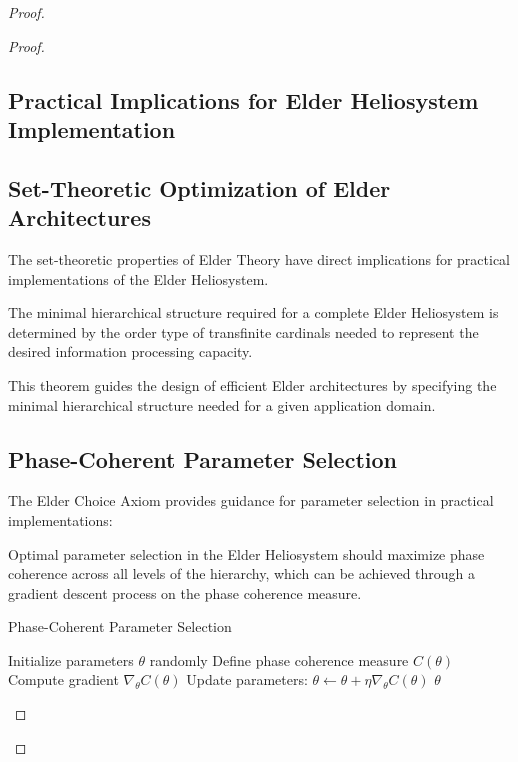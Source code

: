 \begin{theorem}
\begin{definition}
\begin{definition}
\begin{enumerate}
\begin{definition}
\begin{proof}
\begin{definition}
\begin{proof}
\begin{definition}
\section{Practical Implications for Elder Heliosystem Implementation}

\subsection{Set-Theoretic Optimization of Elder Architectures}

The set-theoretic properties of Elder Theory have direct implications for practical implementations of the Elder Heliosystem.

\begin{theorem}
The minimal hierarchical structure required for a complete Elder Heliosystem is determined by the order type of transfinite cardinals needed to represent the desired information processing capacity.
\end{theorem}

This theorem guides the design of efficient Elder architectures by specifying the minimal hierarchical structure needed for a given application domain.

\subsection{Phase-Coherent Parameter Selection}

The Elder Choice Axiom provides guidance for parameter selection in practical implementations:

\begin{proposition}
Optimal parameter selection in the Elder Heliosystem should maximize phase coherence across all levels of the hierarchy, which can be achieved through a gradient descent process on the phase coherence measure.
\end{proposition}

\begin{algorithm}[h]
\caption{Phase-Coherent Parameter Selection}
\begin{algorithmic}[1]
\State Initialize parameters $\theta$ randomly
\State Define phase coherence measure $C(\theta)$
\State Compute gradient $\nabla_{\theta} C(\theta)$
\State Update parameters: $\theta \leftarrow \theta + \eta \nabla_{\theta} C(\theta)$
\EndWhile
\State \Return $\theta$
\end{algorithmic}
\end{algorithm}


\end{definition}
\end{proof}
\end{definition}
\end{proof}
\end{definition}
\end{enumerate}
\end{definition}
\end{definition}
\end{theorem}
